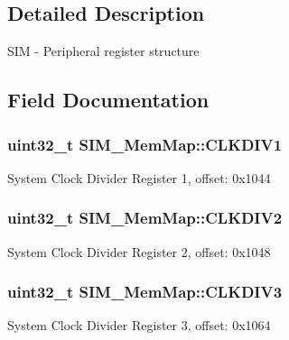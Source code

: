 \subsection{Detailed Description}
S\+I\+M -\/ Peripheral register structure 

\subsection{Field Documentation}
\hypertarget{struct_s_i_m___mem_map_afa315c39ebd4ef380b7f8d67a88d4f82}{}
\subsubsection[{C\+L\+K\+D\+I\+V1}]{\setlength{\rightskip}{0pt plus 5cm}uint32\+\_\+t S\+I\+M\+\_\+\+Mem\+Map\+::\+C\+L\+K\+D\+I\+V1}\label{struct_s_i_m___mem_map_afa315c39ebd4ef380b7f8d67a88d4f82}
System Clock Divider Register 1, offset\+: 0x1044 \hypertarget{struct_s_i_m___mem_map_a5596e21e5998efdcd3e29354487d8f2d}{}
\subsubsection[{C\+L\+K\+D\+I\+V2}]{\setlength{\rightskip}{0pt plus 5cm}uint32\+\_\+t S\+I\+M\+\_\+\+Mem\+Map\+::\+C\+L\+K\+D\+I\+V2}\label{struct_s_i_m___mem_map_a5596e21e5998efdcd3e29354487d8f2d}
System Clock Divider Register 2, offset\+: 0x1048 \hypertarget{struct_s_i_m___mem_map_a57a92b8e7ec91080a8a0731746ac9650}{}
\subsubsection[{C\+L\+K\+D\+I\+V3}]{\setlength{\rightskip}{0pt plus 5cm}uint32\+\_\+t S\+I\+M\+\_\+\+Mem\+Map\+::\+C\+L\+K\+D\+I\+V3}\label{struct_s_i_m___mem_map_a57a92b8e7ec91080a8a0731746ac9650}
System Clock Divider Register 3, offset\+: 0x1064 \hypertarget{struct_s_i_m___mem_map_af62cba904c04181d78d6ae12d49289a6}{}
